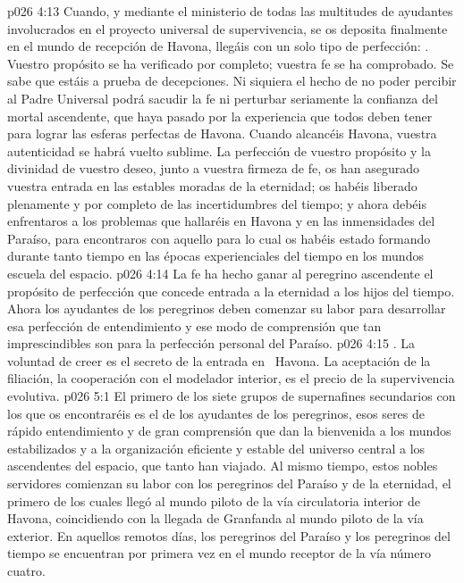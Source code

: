 \vs p026 4:13 Cuando, y mediante el ministerio de todas las multitudes de ayudantes involucrados en el proyecto universal de supervivencia, se os deposita finalmente en el mundo de recepción de Havona, llegáis con un solo tipo de perfección: . Vuestro propósito se ha verificado por completo; vuestra fe se ha comprobado. Se sabe que estáis a prueba de decepciones. Ni siquiera el hecho de no poder percibir al Padre Universal podrá sacudir la fe ni perturbar seriamente la confianza del mortal ascendente, que haya pasado por la experiencia que todos deben tener para lograr las esferas perfectas de Havona. Cuando alcancéis Havona, vuestra autenticidad se habrá vuelto sublime. La perfección de vuestro propósito y la divinidad de vuestro deseo, junto a vuestra firmeza de fe, os han asegurado vuestra entrada en las estables moradas de la eternidad; os habéis liberado plenamente y por completo de las incertidumbres del tiempo; y ahora debéis enfrentaros a los problemas que hallaréis en Havona y en las inmensidades del Paraíso, para encontraros con aquello para lo cual os habéis estado formando durante tanto tiempo en las épocas experienciales del tiempo en los mundos escuela del espacio.
\vs p026 4:14 La fe ha hecho ganar al peregrino ascendente el propósito de perfección que concede entrada a la eternidad a los hijos del tiempo. Ahora los ayudantes de los peregrinos deben comenzar su labor para desarrollar esa perfección de entendimiento y ese modo de comprensión que tan imprescindibles son para la perfección personal del Paraíso.
\vs p026 4:15 . La voluntad de creer es el secreto de la entrada en  Havona. La aceptación de la filiación, la cooperación con el modelador interior, es el precio de la supervivencia evolutiva.
\vs p026 5:1 El primero de los siete grupos de supernafines secundarios con los que os encontraréis es el de los ayudantes de los peregrinos, esos seres de rápido entendimiento y de gran comprensión que dan la bienvenida a los mundos estabilizados y a la organización eficiente y estable del universo central a los ascendentes del espacio, que tanto han viajado. Al mismo tiempo, estos nobles servidores comienzan su labor con los peregrinos del Paraíso y de la eternidad, el primero de los cuales llegó al mundo piloto de la vía circulatoria interior de Havona, coincidiendo con la llegada de Granfanda al mundo piloto de la vía exterior. En aquellos remotos días, los peregrinos del Paraíso y los peregrinos del tiempo se encuentran por primera vez en el mundo receptor de la vía número cuatro.
